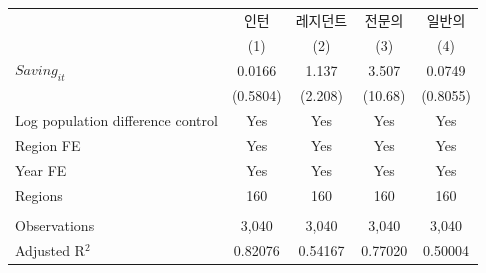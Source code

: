 \begingroup
\centering
\begin{tabular}{lcccc}
   \toprule
                                     & 인턴     & 레지던트 & 전문의  & 일반의 \\   
                                     & (1)      & (2)      & (3)     & (4)\\  
   \midrule 
   $Saving_{it}$                     & 0.0166   & 1.137    & 3.507   & 0.0749\\   
                                     & (0.5804) & (2.208)  & (10.68) & (0.8055)\\   
   Log population difference control & Yes      & Yes      & Yes     & Yes\\  
   Region FE                         & Yes      & Yes      & Yes     & Yes\\  
   Year FE                           & Yes      & Yes      & Yes     & Yes\\  
   Regions                           & 160      & 160      & 160     & 160\\  
    \\
   Observations                      & 3,040    & 3,040    & 3,040   & 3,040\\  
   Adjusted R$^2$                    & 0.82076  & 0.54167  & 0.77020 & 0.50004\\  
   \bottomrule
\end{tabular}
\par\endgroup

